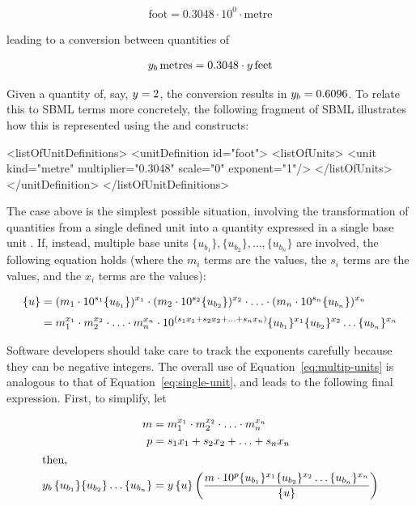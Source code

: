 \begin{linenomath}
\begin{align*}
  \text{foot} = 0.3048 \cdot 10^0 \cdot \text{metre}
\end{align*}
\end{linenomath}
leading to a conversion between quantities of
\begin{linenomath}
\begin{align*}
  y_b \, \text{metres} = 0.3048 \cdot y \, \text{feet}
\end{align*}
\end{linenomath}
Given a quantity of, say, $y = 2$, the conversion results in
$y_b = 0.6096$.  To relate this to SBML terms more concretely,
the following fragment of SBML illustrates how this is represented
using the \Unit and \UnitDefinition constructs:
\begin{example}
<listOfUnitDefinitions>
    <unitDefinition id="foot">
        <listOfUnits>
            <unit kind="metre" multiplier="0.3048" scale="0" exponent="1"/>
        </listOfUnits>
    </unitDefinition>
</listOfUnitDefinitions>
\end{example}

\newcommand{\uone}{\ensuremath{\{u_{b_1}\}}\xspace}
\newcommand{\utwo}{\ensuremath{\{u_{b_2}\}}\xspace}
\newcommand{\un}  {\ensuremath{\{u_{b_n}\}}\xspace}

The case above is the simplest possible situation, involving the
transformation of quantities from a single defined unit \unew into
a quantity expressed in a single base unit \ubase.  If, instead,
multiple base units $\uone, \utwo, \ldots, \un$ are involved, the
following equation holds (where the $m_i$ terms are the
 values, the $s_i$ terms are the 
values, and the $x_i$ terms are the  values):
\begin{linenomath}
\begin{align}
  \{u\} &= (m_1 \cdot 10^{s_1} \uone)^{x_1} \cdot
  (m_2 \cdot 10^{s_2} \utwo)^{x_2} \cdot \ldots \cdot (m_n \cdot
  10^{s_n} \un)^{x_n} \notag
  \\[2pt]
               &= m_1^{x_1} \cdot m_2^{x_2} \cdot \ldots \cdot m_n^{x_n}
  \cdot 10^{(s_1 x_1 + s_2 x_2 + \ldots + s_n x_n)}
  \uone^{x_1} \utwo^{x_2} \ldots \un^{x_n}
\label{eq:multip-units}
\end{align}
\end{linenomath}
Software developers should take care to track the exponents
carefully because they can be negative integers.  The overall use
of Equation~\ref{eq:multip-units} is analogous to that of
Equation~\ref{eq:single-unit}, and leads to the following final
expression.  First, to simplify, let
\begin{linenomath}
\begin{align}
  m &= m_1^{x_1} \cdot m_2^{x_2} \cdot \ldots \cdot m_n^{x_n} \notag\\
  p &= s_1 x_1 + s_2 x_2 + \ldots + s_n x_n \notag\\
\intertext{then,}
  \ybase \, \uone \utwo \ldots \un
    &= \ynew \, \unew \left(
  \frac{m \cdot 10^p \uone^{x_1} \utwo^{x_2} \ldots \un^{x_n}}{\unew}
  \right)
\end{align}
\end{linenomath}


